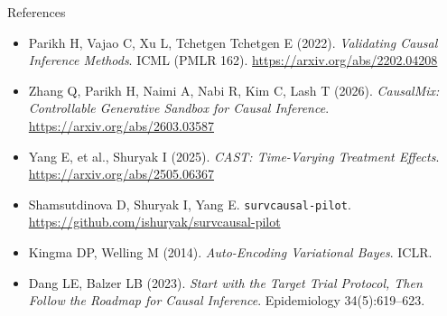 \documentclass[aspectratio=169]{beamer}
\begin{document}
\begin{frame}{References}
  \small
  \begin{itemize}
    \item Parikh H, Vajao C, Xu L, Tchetgen Tchetgen E (2022).
          \emph{Validating Causal Inference Methods}. ICML (PMLR 162).
          \url{https://arxiv.org/abs/2202.04208}
    \item Zhang Q, Parikh H, Naimi A, Nabi R, Kim C, Lash T (2026).
          \emph{CausalMix: Controllable Generative Sandbox for Causal Inference}.
          \url{https://arxiv.org/abs/2603.03587}
    \item Yang E, et al., Shuryak I (2025). \emph{CAST: Time-Varying Treatment Effects}.
          \url{https://arxiv.org/abs/2505.06367}
    \item Shamsutdinova D, Shuryak I, Yang E. \texttt{survcausal-pilot}.
          \url{https://github.com/ishuryak/survcausal-pilot}
    \item Kingma DP, Welling M (2014). \emph{Auto-Encoding Variational Bayes}. ICLR.
    \item Dang LE, Balzer LB (2023). \emph{Start with the Target Trial Protocol, Then
          Follow the Roadmap for Causal Inference}. Epidemiology 34(5):619--623.
  \end{itemize}
\end{frame}
\end{document}

